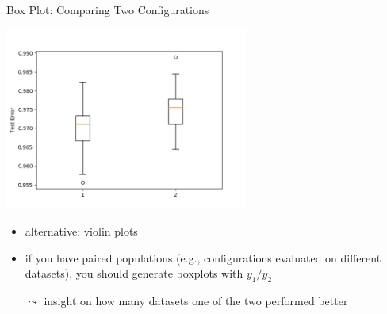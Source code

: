 \begin{frame}[c]{Box Plot: Comparing Two Configurations}

\centering
\includegraphics[width=0.6\textwidth]{scripts/mlp12_boxplot.jpg}

\begin{itemize}
	\item alternative: violin plots
	\pause
	\smallskip
	\item if you have paired populations (e.g., configurations evaluated on different datasets),
			you should generate boxplots with $y_1 / y_2$ 
	\item[$\leadsto$] insight on how many datasets one of the two performed better
\end{itemize}
	

\end{frame}

